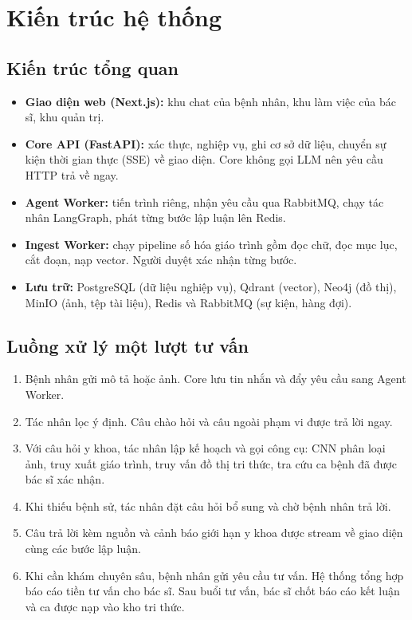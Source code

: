 \section{Kiến trúc hệ thống}
\label{sec:kien-truc-he-thong}

\subsection{Kiến trúc tổng quan}

\begin{itemize}
  \item \textbf{Giao diện web (Next.js):} khu chat của bệnh nhân, khu làm việc của bác sĩ, khu quản trị.
  \item \textbf{Core API (FastAPI):} xác thực, nghiệp vụ, ghi cơ sở dữ liệu, chuyển sự kiện thời gian thực (SSE) về giao diện. Core không gọi LLM nên yêu cầu HTTP trả về ngay.
  \item \textbf{Agent Worker:} tiến trình riêng, nhận yêu cầu qua RabbitMQ, chạy tác nhân LangGraph, phát từng bước lập luận lên Redis.
  \item \textbf{Ingest Worker:} chạy pipeline số hóa giáo trình gồm đọc chữ, đọc mục lục, cắt đoạn, nạp vector. Người duyệt xác nhận từng bước.
  \item \textbf{Lưu trữ:} PostgreSQL (dữ liệu nghiệp vụ), Qdrant (vector), Neo4j (đồ thị), MinIO (ảnh, tệp tài liệu), Redis và RabbitMQ (sự kiện, hàng đợi).
\end{itemize}

\subsection{Luồng xử lý một lượt tư vấn}

\begin{enumerate}
  \item Bệnh nhân gửi mô tả hoặc ảnh. Core lưu tin nhắn và đẩy yêu cầu sang Agent Worker.
  \item Tác nhân lọc ý định. Câu chào hỏi và câu ngoài phạm vi được trả lời ngay.
  \item Với câu hỏi y khoa, tác nhân lập kế hoạch và gọi công cụ: CNN phân loại ảnh, truy xuất giáo trình, truy vấn đồ thị tri thức, tra cứu ca bệnh đã được bác sĩ xác nhận.
  \item Khi thiếu bệnh sử, tác nhân đặt câu hỏi bổ sung và chờ bệnh nhân trả lời.
  \item Câu trả lời kèm nguồn và cảnh báo giới hạn y khoa được stream về giao diện cùng các bước lập luận.
  \item Khi cần khám chuyên sâu, bệnh nhân gửi yêu cầu tư vấn. Hệ thống tổng hợp báo cáo tiền tư vấn cho bác sĩ. Sau buổi tư vấn, bác sĩ chốt báo cáo kết luận và ca được nạp vào kho tri thức.
\end{enumerate}

